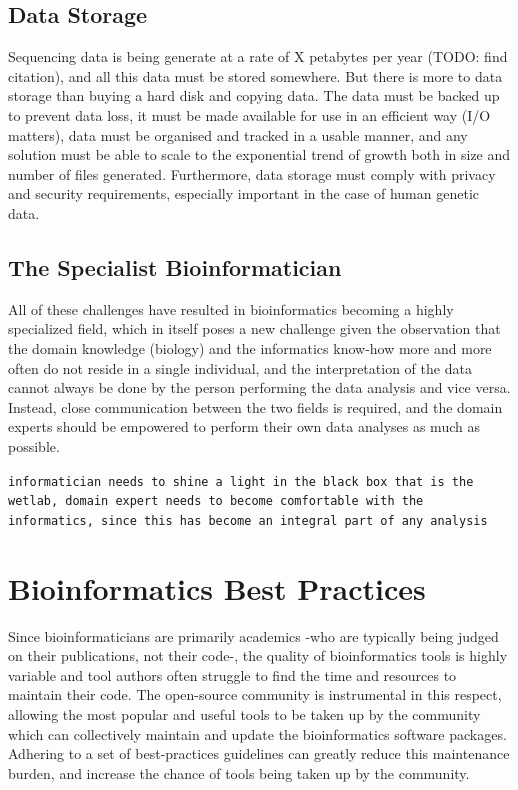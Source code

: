 \subsection{Data Storage}

Sequencing data is being generate at a rate of X petabytes per year (TODO: find citation), and all this data must be stored somewhere. But there is more to data storage than buying a hard disk and copying data. The data must be backed up to prevent data loss, it must be made available for use in an efficient way (I/O matters), data must be organised and tracked in a usable manner, and any solution must be able to scale to the exponential trend of growth both in size and number of files generated. Furthermore, data storage must comply with privacy and security requirements, especially important in the case of human genetic data.


\subsection{The Specialist Bioinformatician}
All of these challenges have resulted in bioinformatics becoming a highly specialized field, which in itself poses a new challenge given the observation that the domain knowledge (biology) and the informatics know-how more and more often do not reside in a single individual, and the interpretation of the data cannot always be done by the person performing the data analysis and vice versa. Instead, close communication between the two fields is required, and the domain experts should be empowered to perform their own data analyses as much as possible.

\verb+informatician needs to shine a light in the black box that is the wetlab, domain expert needs to become comfortable with the informatics, since this has become an integral part of any analysis+


\section{Bioinformatics Best Practices}
Since bioinformaticians are primarily academics -who are typically being judged on their publications, not their code-, the quality of bioinformatics tools is highly variable and tool authors often struggle to find the time and resources to maintain their code. The open-source community is instrumental in this respect, allowing the most popular and useful tools to be taken up by the community which can collectively maintain and update the bioinformatics software packages. Adhering to a set of best-practices guidelines can greatly reduce this maintenance burden, and increase the chance of tools being taken up by the community.

